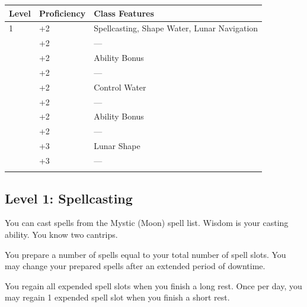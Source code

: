 \documentclass[12pt,letterpaper,twocolumn,openany,nodeprecatedcode,bg=none]{dndbook}
\let\oldsubsection\subsection
\renewcommand{\subsection}[1]{%
  \needspace{5\baselineskip}%
  \oldsubsection{#1}%
}
\begin{document}

{\def\LTcaptype{none} %
\begin{table}[!htbp]
\centering
\begin{tabular}{@{}
  >{\raggedright\arraybackslash}p{}
  >{\raggedright\arraybackslash}p{}
  >{\raggedright\arraybackslash}p{}@{}}
\toprule\noalign{}
\begin{minipage}[b]{\linewidth}\raggedright
Level
\end{minipage} & \begin{minipage}[b]{\linewidth}\raggedright
Proficiency
\end{minipage} & \begin{minipage}[b]{\linewidth}\raggedright
Class Features
\end{minipage} \\
\midrule\noalign{}
1 & +2 & Spellcasting, Shape Water, Lunar Navigation \\
2 & +2 & --- \\
3 & +2 & Ability Bonus \\
4 & +2 & --- \\
5 & +2 & Control Water \\
6 & +2 & --- \\
7 & +2 & Ability Bonus \\
8 & +2 & --- \\
9 & +3 & Lunar Shape \\
10 & +3 & --- \\
\bottomrule\noalign{}
\end{tabular}
\end{table}
}

\subsection{Level 1: Spellcasting}\label{level-1-spellcasting}

You can cast spells from the Mystic (Moon) spell list. Wisdom is your
casting ability. You know two cantrips.

You prepare a number of spells equal to your total number of spell
slots. You may change your prepared spells after an extended period of
downtime.

You regain all expended spell slots when you finish a long rest. Once
per day, you may regain 1 expended spell slot when you finish a short
rest.
\end{document}
